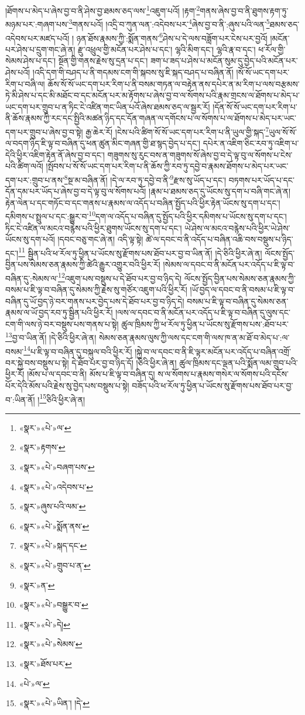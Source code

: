 །ཐོགས་པ་མེད་པ་ཞེས་བྱ་བ་ནི་ཤེས་བྱ་ཐམས་ཅད་ལས་\footnote{«སྣར་»«པེ་»ལ་}འཇུག་པའོ། །རྟག་\footnote{«སྣར་»རྟགས་}གནས་ཞེས་བྱ་བ་ནི་ཐུགས་རྟག་ཏུ་མཉམ་པར་:གཞག་པས་\footnote{«སྣར་»«པེ་»བཞག་པས་}གནས་པའོ། །འདྲི་བ་ཀུན་ལན་:འདེབས་པར་\footnote{«སྣར་»«པེ་»འདེབས་པ་}ཞེས་བྱ་བ་ནི་:ཞུས་པའི་ལན་\footnote{«སྣར་»ཞུས་པའི་ལམ་}ཐམས་ཅད་འདེབས་པར་མཛད་པའོ། །
ཉན་ཐོས་རྣམས་ཀྱི་:སྨོན་གནས་\footnote{«སྣར་»«པེ་»སྨོན་ནས་}ཤེས་པ་དེ་ལས་བཟློག་པར་ངེས་པར་བྱའོ། །མངོན་པར་ཤེས་པ་དྲུག་གང་ཞེ་ན། རྫུ་འཕྲུལ་གྱི་མངོན་པར་ཤེས་པ་དང་། ལྷའི་མིག་དང་། ལྷའི་རྣ་བ་དང་། ཕ་རོལ་གྱི་སེམས་ཤེས་པ་དང་། སྔོན་གྱི་གནས་རྗེས་སུ་དྲན་པ་དང་། ཟག་པ་ཟད་པ་ཤེས་པ་མངོན་སུམ་དུ་བྱེད་པའི་མངོན་པར་ཤེས་པའོ། །འདི་དག་གི་བཤད་པ་ནི་གདམས་ངག་གི་སྐབས་སུ་ཇི་སྐད་བཤད་པ་བཞིན་ནོ། །སོ་སོ་ཡང་དག་པར་རིག་པ་བཞི་ལ། ཆོས་སོ་སོ་ཡང་དག་པར་རིག་པ་ནི་བསམ་གཏན་ལ་བརྟེན་ནས་དཔེར་ན་མ་རིག་པ་ལས་བརྩམས་ཏེ་མི་ཤེས་པ་དང་མི་མཐོང་བ་དང་མངོན་པར་མ་རྟོགས་པ་ཞེས་བྱ་བ་ལ་སོགས་པའི་རྣམ་གྲངས་ལ་ཐོགས་པ་མེད་པ་ཡང་དག་པར་གྲུབ་པ་ན་ཏིང་ངེ་འཛིན་གང་ཡིན་པའོ་ཞེས་ཐམས་ཅད་ལ་སྦྱར་རོ། །དོན་སོ་སོ་ཡང་དག་པར་རིག་པ་ནི་ཆོས་རྣམས་ཀྱི་རང་དང་སྤྱིའི་མཚན་ཉིད་དང་དོན་གཞན་ལ་དགོངས་པ་ལ་སོགས་པ་ལ་ཐོགས་པ་མེད་པར་ཡང་དག་པར་གྲུབ་པ་ཞེས་བྱ་བ་སྟེ། རྒྱ་ཆེར་རོ། །ངེས་པའི་ཚིག་སོ་སོ་ཡང་དག་པར་རིག་པ་ནི་ཡུལ་གྱི་སྐད་\footnote{«སྣར་»«པེ་»སྐད་དང་}ཡུལ་སོ་སོ་ལ་བདག་ཉིད་ཇི་ལྟ་བ་བཞིན་དུ་ཕན་ཚུན་མིང་གཞན་གྱི་ཐ་སྙད་བྱེད་པ་དང་། དཔེར་ན་འཇིག་ཅིང་རབ་ཏུ་འཇིག་པ་དེའི་ཕྱིར་འཇིག་རྟེན་ནོ་ཞེས་བྱ་བ་དང་། གཟུགས་སུ་རུང་བས་ན་གཟུགས་སོ་ཞེས་བྱ་བ་དེ་ལྟ་བུ་ལ་སོགས་པ་ངེས་པའི་ཚིག་ལའོ། །སྤོབས་པ་སོ་སོ་ཡང་དག་པར་རིག་པ་ནི་ཆོས་ཀྱི་རབ་ཏུ་དབྱེ་བ་རྣམས་ཐོགས་པ་མེད་པར་ཡང་དག་པར་:གྲུབ་པ་ནས་\footnote{«སྣར་»«པེ་»གྲུབ་པ་ན་}སྔ་མ་བཞིན་ནོ། །དེ་ལ་རབ་ཏུ་དབྱེ་བ་ནི་\footnote{«སྣར་»ན་}རྫས་སུ་ཡོད་པ་དང་། བཏགས་པར་ཡོད་པ་དང་དོན་དམ་པར་ཡོད་པ་ཞེས་བྱ་བ་དེ་ལྟ་བུ་ལ་སོགས་པའོ། །རྣམ་པ་ཐམས་ཅད་དུ་ཡོངས་སུ་དག་པ་བཞི་གང་ཞེ་ན། རྟེན་ལེན་པ་དང་གཏོང་བ་དང་གནས་པ་རྣམས་ལ་འདོད་པ་བཞིན་སྤྱོད་པའི་ཕྱིར་རྟེན་ཡོངས་སུ་དག་པ་དང་། དམིགས་པ་སྤྲུལ་པ་དང་:སྒྱུར་བ་\footnote{«སྣར་»«པེ་»བསྒྱུར་བ་}དག་ལ་འདོད་པ་བཞིན་དུ་སྤྱོད་པའི་ཕྱིར་དམིགས་པ་ཡོངས་སུ་དག་པ་དང་། ཏིང་ངེ་འཛིན་ལ་མངའ་བརྙེས་པའི་ཕྱིར་ཐུགས་ཡོངས་སུ་དག་པ་དང་། ཡེ་ཤེས་ལ་མངའ་བརྙེས་པའི་ཕྱིར་ཡེ་ཤེས་ཡོངས་སུ་དག་པའོ། །དབང་བཅུ་གང་ཞེ་ན། འདི་ལྟ་སྟེ། ཚེ་ལ་དབང་བ་ནི་འདོད་པ་བཞིན་འཆི་བས་བསྡུས་པ་ཉིད་དང་།\footnote{«སྣར་»«པེ་»དེ།} སྦྱིན་པའི་ཕ་རོལ་ཏུ་ཕྱིན་པ་ཡོངས་སུ་རྫོགས་པས་ཐོབ་པར་བྱ་བ་ཡིན་ནོ། །དེ་ཅིའི་ཕྱིར་ཞེ་ན། ལོངས་སྤྱོད་བྱིན་པས་སེམས་ཅན་རྣམས་ཀྱི་ཚེའི་རྒྱུར་འགྱུར་བའི་ཕྱིར་རོ། །སེམས་ལ་དབང་བ་ནི་མངོན་པར་འདོད་པ་ཇི་ལྟ་བ་བཞིན་དུ་:སེམས་ལ་\footnote{«སྣར་»«པེ་»སེམས་}འཇུག་པས་བསྡུས་པ་དེ་ཐོབ་པར་བྱ་བ་ཉིད་དེ། ལོངས་སྤྱོད་བྱིན་པས་སེམས་ཅན་རྣམས་ཀྱི་བསམ་པ་ཇི་ལྟ་བ་བཞིན་དུ་སེམས་ཀྱི་རྗེས་སུ་གཙོར་འཇུག་པའི་ཕྱིར་རོ། །ཡོ་བྱད་ལ་དབང་བ་ནི་བསམ་པ་ཇི་ལྟ་བ་བཞིན་དུ་ཡོ་བྱད་ཉེ་བར་གནས་པར་བྱེད་པས་དེ་ཐོབ་པར་བྱ་བ་ཉིད་དེ། བསམ་པ་ཇི་ལྟ་བ་བཞིན་དུ་སེམས་ཅན་རྣམས་ལ་ཡོ་བྱད་རབ་ཏུ་སྦྱིན་པའི་ཕྱིར་རོ། །ལས་ལ་དབང་བ་ནི་མངོན་པར་འདོད་པ་ཇི་ལྟ་བ་བཞིན་དུ་ལུས་དང་ངག་གི་ལས་ཉེ་བར་བསྡུས་པས་གནས་པ་སྟེ། ཚུལ་ཁྲིམས་ཀྱི་ཕ་རོལ་ཏུ་ཕྱིན་པ་ཡོངས་སུ་རྫོགས་པས་:ཐོབ་པར་\footnote{«སྣར་»ཐོས་པར་}བྱ་བ་ཡིན་ནོ། །དེ་ཅིའི་ཕྱིར་ཞེ་ན། སེམས་ཅན་རྣམས་ལུས་ཀྱི་ལས་དང་ངག་གི་ལས་ཁ་ན་མ་ཐོ་བ་མེད་པ་:ལ་བསམ་\footnote{«པེ་»ལ་}པ་ཇི་ལྟ་བ་བཞིན་དུ་བསྐུལ་བའི་ཕྱིར་རོ། །སྐྱེ་བ་ལ་དབང་བ་ནི་ཇི་ལྟར་མངོན་པར་འདོད་པ་བཞིན་འགྲོ་བར་སྐྱེ་བས་བསྡུས་པ་སྟེ། དེ་ཐོབ་པར་བྱ་བ་ཉིད་དོ། །ཅིའི་ཕྱིར་ཞེ་ན། ཚུལ་ཁྲིམས་དང་ལྡན་པའི་སྨོན་ལམ་གྲུབ་པའི་ཕྱིར་རོ། །མོས་པ་ལ་དབང་བ་ནི། མོས་པ་ཇི་ལྟ་བ་བཞིན་དུ། ས་ལ་སོགས་པ་རྣམས་གསེར་ལ་སོགས་པའི་དངོས་པོར་དེའི་མོས་པའི་རྗེས་སུ་བྱེད་པས་བསྡུས་པ་སྟེ། བཟོད་པའི་ཕ་རོལ་ཏུ་ཕྱིན་པ་ཡོངས་སུ་རྫོགས་པས་ཐོབ་པར་བྱ་བ་:ཡིན་ནོ། །\footnote{«སྣར་»«པེ་»ཡིན་། །དེ་}ཅིའི་ཕྱིར་ཞེ་ན། 